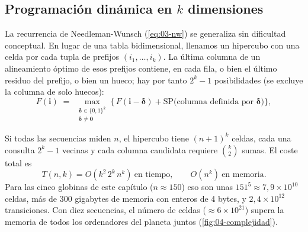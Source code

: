 \subsection{Programación dinámica en $k$ dimensiones}

La recurrencia de Needleman-Wunsch (\cref{eq:03-nw}) se generaliza sin dificultad conceptual. En lugar de una tabla bidimensional, llenamos un hipercubo con una celda por cada tupla de prefijos $(i_1,\dots,i_k)$. La última columna de un alineamiento óptimo de esos prefijos contiene, en cada fila, o bien el último residuo del prefijo, o bien un hueco; hay por tanto $2^k-1$ posibilidades (se excluye la columna de solo huecos):
\begin{equation}\label{eq:04-dpk}
F(\mathbf{i}) \;=\; \max_{\substack{\boldsymbol{\delta}\in\{0,1\}^k\\ \boldsymbol{\delta}\neq \mathbf{0}}}
\Big\{\,F(\mathbf{i}-\boldsymbol{\delta}) + \mathrm{SP}\big(\text{columna definida por }\boldsymbol{\delta}\big)\Big\},
\end{equation}

\begin{simbolos}
\end{simbolos}

Si todas las secuencias miden $n$, el hipercubo tiene $(n+1)^k$ celdas, cada una consulta $2^k-1$ vecinas y cada columna candidata requiere $\binom{k}{2}$ sumas. El coste total es
\begin{equation}\label{eq:04-costo}
T(n,k) = O\!\left(k^2\,2^k\,n^k\right)\ \text{en tiempo}, \qquad O\!\left(n^k\right)\ \text{en memoria}.
\end{equation}
Para las cinco globinas de este capítulo ($n\approx150$) eso son unas $151^5\approx7{,}9\times10^{10}$ celdas, más de 300 gigabytes de memoria con enteros de 4 bytes, y $2{,}4\times10^{12}$ transiciones. Con diez secuencias, el número de celdas ($\approx6\times10^{21}$) supera la memoria de todos los ordenadores del planeta juntos (\cref{fig:04-complejidad}).

